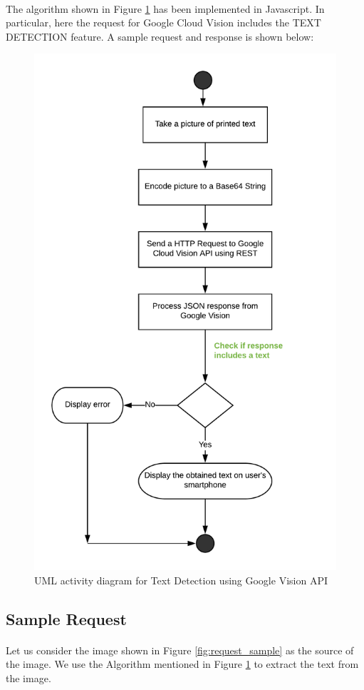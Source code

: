 \documentclass[12pt]{article}
\begin{document}
\paragraph{}The algorithm shown in Figure \ref{fig:vision} has been implemented in Javascript. In particular, here the request for Google Cloud Vision includes the TEXT DETECTION feature. A sample request and response is shown below:

\begin{figure}[H]
	\centering
	\includegraphics[width=0.75\linewidth]{media/VISION_API.png}
	\caption{UML activity diagram for Text Detection using Google Vision API}
	\label{fig:vision}
\end{figure} 

\subsection{Sample Request}

\paragraph{}Let us consider the image shown in Figure \ref{fig:request_sample} as the source of the image. We use the Algorithm mentioned in Figure \ref{fig:vision} to extract the text from the image.
\end{document}
